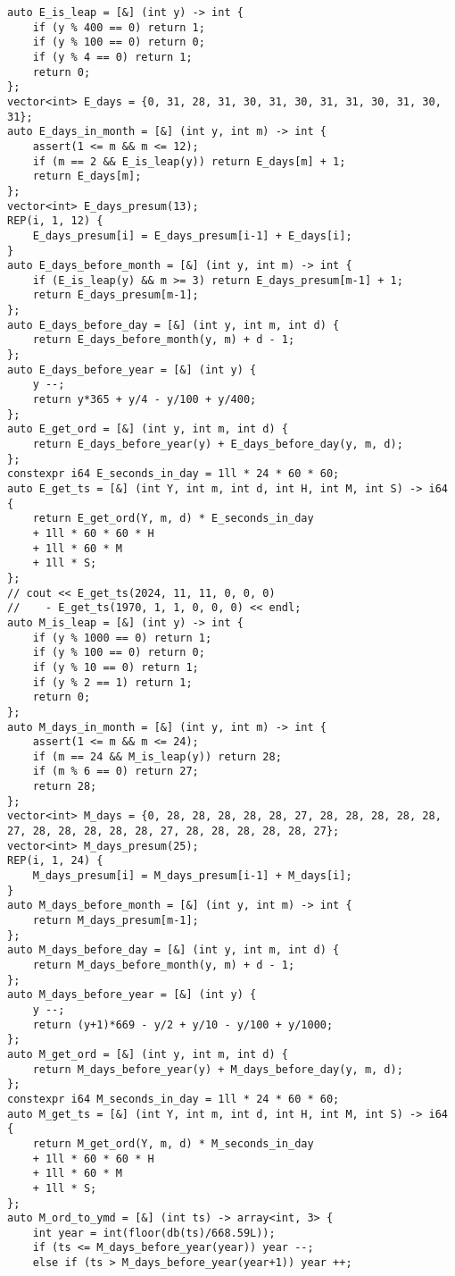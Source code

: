 \documentclass[a4paper,landscape,twocolumn]{ctexart}
\begin{document}
\begin{lstlisting}
auto E_is_leap = [&] (int y) -> int {
	if (y % 400 == 0) return 1;
	if (y % 100 == 0) return 0;
	if (y % 4 == 0) return 1;
	return 0;
};
vector<int> E_days = {0, 31, 28, 31, 30, 31, 30, 31, 31, 30, 31, 30, 31};
auto E_days_in_month = [&] (int y, int m) -> int {
	assert(1 <= m && m <= 12);
	if (m == 2 && E_is_leap(y)) return E_days[m] + 1;
	return E_days[m];
};
vector<int> E_days_presum(13);
REP(i, 1, 12) {
	E_days_presum[i] = E_days_presum[i-1] + E_days[i];
}
auto E_days_before_month = [&] (int y, int m) -> int {
	if (E_is_leap(y) && m >= 3) return E_days_presum[m-1] + 1;
	return E_days_presum[m-1];
};
auto E_days_before_day = [&] (int y, int m, int d) {
	return E_days_before_month(y, m) + d - 1;
};
auto E_days_before_year = [&] (int y) {
	y --;
	return y*365 + y/4 - y/100 + y/400;
};
auto E_get_ord = [&] (int y, int m, int d) {
	return E_days_before_year(y) + E_days_before_day(y, m, d);
};
constexpr i64 E_seconds_in_day = 1ll * 24 * 60 * 60;
auto E_get_ts = [&] (int Y, int m, int d, int H, int M, int S) -> i64 {
	return E_get_ord(Y, m, d) * E_seconds_in_day
	+ 1ll * 60 * 60 * H
	+ 1ll * 60 * M
	+ 1ll * S;
};
// cout << E_get_ts(2024, 11, 11, 0, 0, 0)
//	  - E_get_ts(1970, 1, 1, 0, 0, 0) << endl;
auto M_is_leap = [&] (int y) -> int {
	if (y % 1000 == 0) return 1;
	if (y % 100 == 0) return 0;
	if (y % 10 == 0) return 1;
	if (y % 2 == 1) return 1;
	return 0;
};
auto M_days_in_month = [&] (int y, int m) -> int {
	assert(1 <= m && m <= 24);
	if (m == 24 && M_is_leap(y)) return 28;
	if (m % 6 == 0) return 27;
	return 28;
};
vector<int> M_days = {0, 28, 28, 28, 28, 28, 27, 28, 28, 28, 28, 28, 27, 28, 28, 28, 28, 28, 27, 28, 28, 28, 28, 28, 27};
vector<int> M_days_presum(25);
REP(i, 1, 24) {
	M_days_presum[i] = M_days_presum[i-1] + M_days[i];
}
auto M_days_before_month = [&] (int y, int m) -> int {
	return M_days_presum[m-1];
};
auto M_days_before_day = [&] (int y, int m, int d) {
	return M_days_before_month(y, m) + d - 1;
};
auto M_days_before_year = [&] (int y) {
	y --;
	return (y+1)*669 - y/2 + y/10 - y/100 + y/1000;
};
auto M_get_ord = [&] (int y, int m, int d) {
	return M_days_before_year(y) + M_days_before_day(y, m, d);
};
constexpr i64 M_seconds_in_day = 1ll * 24 * 60 * 60;
auto M_get_ts = [&] (int Y, int m, int d, int H, int M, int S) -> i64 {
	return M_get_ord(Y, m, d) * M_seconds_in_day
	+ 1ll * 60 * 60 * H
	+ 1ll * 60 * M
	+ 1ll * S;
};
auto M_ord_to_ymd = [&] (int ts) -> array<int, 3> {
	int year = int(floor(db(ts)/668.59L));
	if (ts <= M_days_before_year(year)) year --;
	else if (ts > M_days_before_year(year+1)) year ++;

\end{lstlisting}
\end{document}
